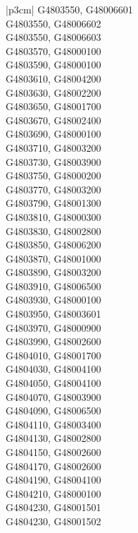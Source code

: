 \begin{customLongTable}{ |p{3cm}| }
G4803550, G48006601 \\ \hline
G4803550, G48006602 \\ \hline
G4803550, G48006603 \\ \hline
G4803570, G48000100 \\ \hline
G4803590, G48000100 \\ \hline
G4803610, G48004200 \\ \hline
G4803630, G48002200 \\ \hline
G4803650, G48001700 \\ \hline
G4803670, G48002400 \\ \hline
G4803690, G48000100 \\ \hline
G4803710, G48003200 \\ \hline
G4803730, G48003900 \\ \hline
G4803750, G48000200 \\ \hline
G4803770, G48003200 \\ \hline
G4803790, G48001300 \\ \hline
G4803810, G48000300 \\ \hline
G4803830, G48002800 \\ \hline
G4803850, G48006200 \\ \hline
G4803870, G48001000 \\ \hline
G4803890, G48003200 \\ \hline
G4803910, G48006500 \\ \hline
G4803930, G48000100 \\ \hline
G4803950, G48003601 \\ \hline
G4803970, G48000900 \\ \hline
G4803990, G48002600 \\ \hline
G4804010, G48001700 \\ \hline
G4804030, G48004100 \\ \hline
G4804050, G48004100 \\ \hline
G4804070, G48003900 \\ \hline
G4804090, G48006500 \\ \hline
G4804110, G48003400 \\ \hline
G4804130, G48002800 \\ \hline
G4804150, G48002600 \\ \hline
G4804170, G48002600 \\ \hline
G4804190, G48004100 \\ \hline
G4804210, G48000100 \\ \hline
G4804230, G48001501 \\ \hline
G4804230, G48001502 \\ \hline

\end{customLongTable}
